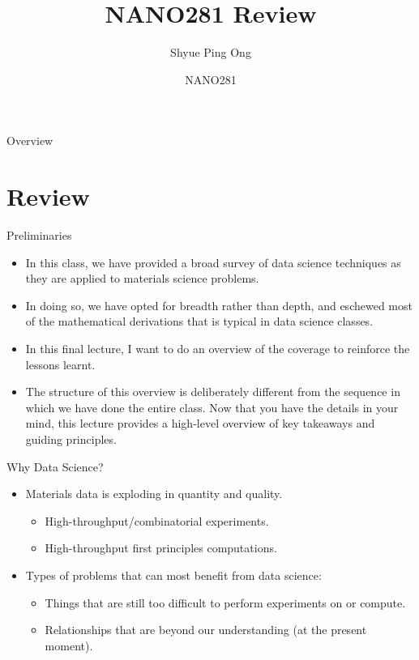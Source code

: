 \documentclass[aspectratio=169]{beamer}
\title[NANO281 Review]{NANO281 Review}
\author{Shyue Ping Ong}
\institute[UCSD]{University of California, San Diego\\
\medskip
}
\date{NANO281} %
\begin{document}
\begin{frame}
    \titlepage %
\end{frame}


\begin{frame}{Overview}
    \tableofcontents
\end{frame}


\section{Review}


\begin{frame}{Preliminaries}
    \begin{itemize}
        \item In this class, we have provided a broad survey of data science techniques as they are applied to materials science problems.
        \item In doing so, we have opted for breadth rather than depth, and eschewed most of the mathematical derivations that is typical in data science classes.
        \item In this final lecture, I want to do an overview of the coverage to reinforce the lessons learnt.
        \item The structure of this overview is deliberately different from the sequence in which we have done the entire class. Now that you have the details in your mind, this lecture provides a high-level overview of key takeaways and guiding principles.
    \end{itemize}
\end{frame}


\begin{frame}{Why Data Science?}
    \begin{itemize}
        \item Materials data is exploding in quantity and quality.
        \begin{itemize}
            \item High-throughput/combinatorial experiments.
            \item High-throughput first principles computations.
        \end{itemize}
        \item Types of problems that can most benefit from data science:
        \begin{itemize}
            \item Things that are still too difficult to perform experiments on or compute.
            \item Relationships that are beyond our understanding (at the present moment). 
        \end{itemize}
    \end{itemize}
\end{frame}
\end{document}
